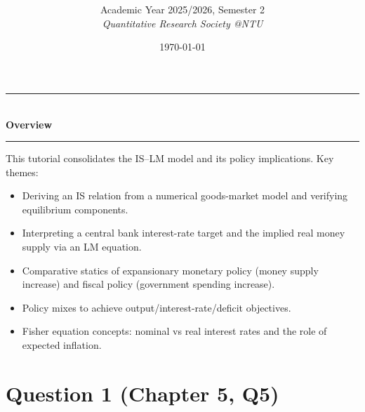 \documentclass[12pt]{article}
\title{
\CourseCode \CourseName \\[0.3em]
\large \DocType
}
\author{
  Academic Year 2025/2026, Semester 2 \\[0.25em]
  \textit{Quantitative Research Society @NTU}
}
\date{\today}
\begin{document}
\maketitle
\thispagestyle{plainfirst}
\pagestyle{main}
\bigskip

\begin{center}
  \rule{0.8\textwidth}{0.4pt}\\[4pt]
  \textbf{Overview}\\[2pt]
  \rule{0.8\textwidth}{0.4pt}
\end{center}

\noindent
This tutorial consolidates the IS--LM model and its policy implications. Key themes:
\begin{itemize}[leftmargin=*]
  \item Deriving an IS relation from a numerical goods-market model and verifying equilibrium components.
  \item Interpreting a central bank interest-rate target and the implied real money supply via an LM equation.
  \item Comparative statics of expansionary monetary policy (money supply increase) and fiscal policy (government spending increase).
  \item Policy mixes to achieve output/interest-rate/deficit objectives.
  \item Fisher equation concepts: nominal vs real interest rates and the role of expected inflation.
\end{itemize}

\newpage

\section*{Question 1 (Chapter 5, Q5)}
\end{document}
